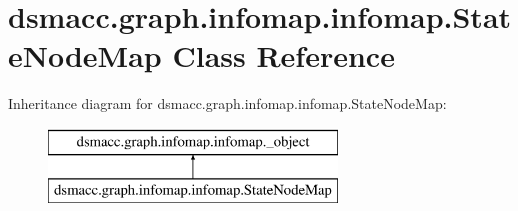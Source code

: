 \hypertarget{classdsmacc_1_1graph_1_1infomap_1_1infomap_1_1StateNodeMap}{}\section{dsmacc.\+graph.\+infomap.\+infomap.\+State\+Node\+Map Class Reference}
\label{classdsmacc_1_1graph_1_1infomap_1_1infomap_1_1StateNodeMap}
Inheritance diagram for dsmacc.\+graph.\+infomap.\+infomap.\+State\+Node\+Map\+:\begin{figure}[H]
\begin{center}
\leavevmode
\includegraphics[height=2.000000cm]{classdsmacc_1_1graph_1_1infomap_1_1infomap_1_1StateNodeMap}
\end{center}
\end{figure}
